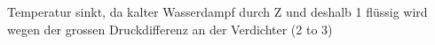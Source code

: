 Temperatur sinkt, da kalter Wasserdampf durch Z und deshalb 1 flüssig wird wegen der grossen Druckdifferenz an der Verdichter (2 to 3)